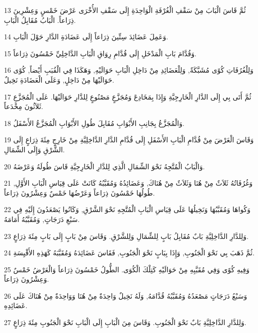 \par 13 ثُمَّ قَاسَ الْبَابَ مِنْ سَقْفِ الْغُرْفَةِ الْوَاحِدَةِ إِلَى سَقْفِ الأُخْرَى عَرْضَ خَمْسٍ وَعِشْرِينَ ذِرَاعاً. الْبَابُ مُقَابِلُ الْبَابِ.
\par 14 وَعَمِلَ عَضَائِدَ سِتِّينَ ذِرَاعاً إِلَى عَضَادَةِ الدَّارِ حَوْلَ الْبَابِ.
\par 15 وَقُدَّامَ بَابِ الْمَدْخَلِ إِلَى قُدَّامِ رِوَاقِ الْبَابِ الدَّاخِلِيِّ خَمْسُونَ ذِرَاعاً.
\par 16 وَلِلْغُرُفَاتِ كُوًى مُشَبَّكَةٌ, وَلِلْعَضَائِدِ مِنْ دَاخِلِ الْبَابِ حَوَالَيْهِ, وَهَكَذَا فِي الْقُبَبِ أَيْضاً, كُوًى حَوَالَيْهَا مِنْ دَاخِلٍ, وَعَلَى الْعَضَادَةِ نَخِيلٌ.
\par 17 ثُمَّ أَتَى بِي إِلَى الدَّارِ الْخَارِجِيَّةِ وَإِذَا بِمَخَادِعَ وَمُجَزَّعٍ مَصْنُوعٍ لِلدَّارِ حَوَالَيْهَا. عَلَى الْمُجَزَّعِ ثَلاَثُونَ مِخْدَعاً.
\par 18 وَالْمُجَزَّعُ بِجَانِبِ الأَبْوَابِ مُقَابِلَ طُولِ الأَبْوَابِ الْمُجَزَّعُ الأَسْفَلُ.
\par 19 وَقَاسَ الْعَرْضَ مِنْ قُدَّامِ الْبَابِ الأَسْفَلِ إِلَى قُدَّامِ الدَّارِ الدَّاخِلِيَّةِ مِنْ خَارِجٍ مِئَةَ ذِرَاعٍ إِلَى الشَّرْقِ وَإِلَى الشِّمَالِ.
\par 20 وَالْبَابُ الْمُتَّجِهُ نَحْوَ الشِّمَالِ الَّذِي لِلدَّارِ الْخَارِجِيَّةِ قَاسَ طُولَهُ وَعَرْضَهُ.
\par 21 وَغُرُفَاتُهُ ثَلاَثٌ مِنْ هُنَا وَثَلاَثٌ مِنْ هُنَاكَ, وَعَضَائِدُهُ وَمُقَبَّبُهُ كَانَتْ عَلَى قِيَاسِ الْبَابِ الأَوَّلِ, طُولُهَا خَمْسُونَ ذِرَاعاً وَعَرْضُهَا خَمْسٌ وَعِشْرُونَ ذِرَاعاً.
\par 22 وَكُواهَا وَمُقَبَّبُهَا وَنَخِيلُهَا عَلَى قِيَاسِ الْبَابِ الْمُتَّجِهِ نَحْوَ الشَّرْقِ, وَكَانُوا يَصْعَدُونَ إِلَيْهِ فِي سَبْعِ دَرَجَاتٍ, وَمُقَبَّبُهُ أَمَامَهُ.
\par 23 وَلِلدَّارِ الدَّاخِلِيَّةِ بَابٌ مُقَابِلُ بَابٍ لِلشِّمَالِ وَلِلشَّرْقِ. وَقَاسَ مِنْ بَابٍ إِلَى بَابٍ مِئَةَ ذِرَاعٍ.
\par 24 ثُمَّ ذَهَبَ بِي نَحْوَ الْجَنُوبِ, وَإِذَا بِبَابٍ نَحْوَ الْجَنُوبِ, فَقَاسَ عَضَائِدَهُ وَمُقَبَّبَهُ كَهَذِهِ الأَقْيِسَةِ.
\par 25 وَفِيهِ كُوًى وَفِي مُقَبَّبِهِ مِنْ حَوَالَيْهِ كَتِلْكَ الْكُوَى. الطُّولُ خَمْسُونَ ذِرَاعاً وَالْعَرْضُ خَمْسٌ وَعِشْرُونَ ذِرَاعاً.
\par 26 وَسَبْعُ دَرَجَاتٍ مَصْعَدُهُ وَمُقَبَّبُهُ قُدَّامَهُ, وَلَهُ نَخِيلٌ وَاحِدَةٌ مِنْ هُنَا وَوَاحِدَةٌ مِنْ هُنَاكَ عَلَى عَضَائِدِهِ.
\par 27 وَلِلدَّارِ الدَّاخِلِيَّةِ بَابٌ نَحْوَ الْجَنُوبِ. وَقَاسَ مِنَ الْبَابِ إِلَى الْبَابِ نَحْوَ الْجَنُوبِ مِئَةَ ذِرَاعٍ.
